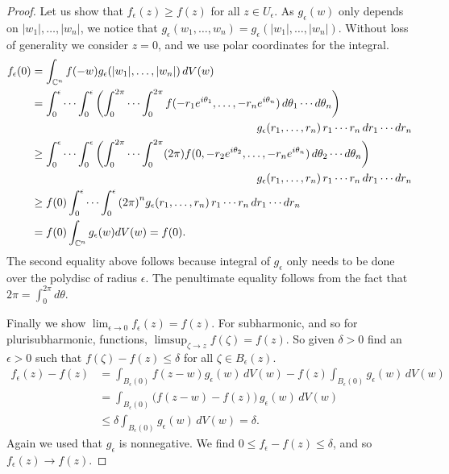 \documentclass[12pt,openany]{book}
\newcommand{\sabs}[1]{\lvert {#1} \rvert}
\newcommand{\C}{{\mathbb{C}}}
\theoremstyle{plain}
\theoremstyle{remark}
\theoremstyle{definition}
\theoremstyle{exercise}
\theoremstyle{example}
\begin{document}
\begin{proof}
Let us show that $f_\epsilon(z) \geq f(z)$ for all $z \in U_\epsilon$.
As $g_\epsilon(w)$ only depends on $\sabs{w_1},\ldots,\sabs{w_n}$, we notice
that
$g_\epsilon(w_1,\ldots,w_n) =
g_\epsilon(\sabs{w_1},\ldots,\sabs{w_n})$.
Without loss of generality we consider $z=0$, and we use polar coordinates
for the integral.
\pagebreak[1]
\begin{equation*}
\begin{split}
f_\epsilon(0)
& =
\int_{\C^n} f(-w) g_\epsilon (\sabs{w_1},\ldots,\sabs{w_n})
\, dV(w)
\\
& =
\int_0^\epsilon \cdots
\int_0^\epsilon
\left(
\int_0^{2\pi}
\cdots
\int_0^{2\pi}
 f(-r_1e^{i\theta_1},\ldots,
-r_ne^{i\theta_n}) \,
d\theta_1 \cdots d\theta_n \right)
\\
& \hspace{2.8in}
g_\epsilon (r_1,\ldots,r_n) \,
 r_1 \cdots r_n \,d r_1 \cdots d r_n
\\
& \geq
\int_0^\epsilon \cdots
\int_0^\epsilon
\left(
\int_0^{2\pi}
\cdots
\int_0^{2\pi}
(2\pi)
 f(0,-r_2e^{i\theta_2},\ldots,
-r_ne^{i\theta_n}) \,
d\theta_2 \cdots d\theta_n \right)
\\
& \hspace{2.8in}
g_\epsilon (r_1,\ldots,r_n) \,
 r_1 \cdots r_n \,d r_1 \cdots d r_n
\\
& \geq
f(0)
\int_0^\epsilon \cdots
\int_0^\epsilon
{(2\pi)}^n
g_\epsilon (r_1,\ldots,r_n) \,
 r_1 \cdots r_n \,d r_1 \cdots d r_n
\\
& = f(0) \int_{\C^n} g_\epsilon (w) dV(w)
= f(0) .
\end{split}
\end{equation*}
The second equality above
follows because integral of $g_\epsilon$ only needs to be
done over the polydisc of radius $\epsilon$.
The penultimate equality follows from the fact that
$2\pi = \int_0^{2\pi}d \theta$.

Finally we show $\lim_{\epsilon \to 0} f_\epsilon (z) = f(z)$.
For subharmonic, and so for plurisubharmonic,
functions, $\limsup_{\zeta\to z} f(\zeta) = f(z)$.
So given $\delta >0$ find an $\epsilon >0$ such that
$f(\zeta)-f(z) \leq \delta$ for all $\zeta \in B_\epsilon(z)$.
\begin{equation*}
\begin{split}
f_\epsilon(z) - f(z)
& =
\int_{B_\epsilon(0)} f(z-w) g_\epsilon (w)
\, dV(w)
- f(z) 
\int_{B_\epsilon(0)} g_\epsilon (w)
\, dV(w)
\\
& =
\int_{B_\epsilon(0)} \bigl(f(z-w)-f(z)\bigr)\, g_\epsilon (w)
\, dV(w)
\\
& \leq
\delta
\int_{B_\epsilon(0)} g_\epsilon (w)
\, dV(w)
= \delta .
\end{split}
\end{equation*}
Again we used that $g_\epsilon$ is nonnegative.
We find $0 \leq f_\epsilon - f(z) \leq \delta$, and so $f_\epsilon(z) \to
f(z)$.
\end{proof}
\end{document}
